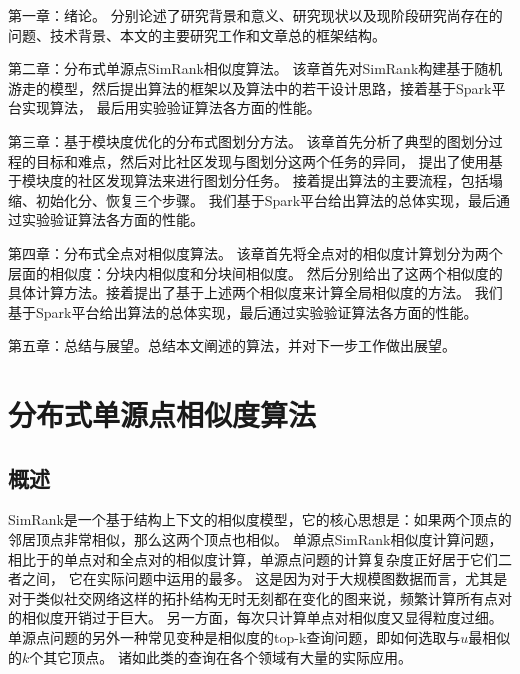 \documentclass[master]{njuthesis}
\begin{document}
第一章：绪论。 分别论述了研究背景和意义、研究现状以及现阶段研究尚存在的问题、技术背景、本文的主要研究工作和文章总的框架结构。

第二章：分布式单源点SimRank相似度算法。 
该章首先对SimRank构建基于随机游走的模型，然后提出算法的框架以及算法中的若干设计思路，接着基于Spark平台实现算法，
最后用实验验证算法各方面的性能。

第三章：基于模块度优化的分布式图划分方法。 该章首先分析了典型的图划分过程的目标和难点，然后对比社区发现与图划分这两个任务的异同，
提出了使用基于模块度的社区发现算法来进行图划分任务。 接着提出算法的主要流程，包括塌缩、初始化分、恢复三个步骤。
我们基于Spark平台给出算法的总体实现，最后通过实验验证算法各方面的性能。

第四章：分布式全点对相似度算法。 该章首先将全点对的相似度计算划分为两个层面的相似度：分块内相似度和分块间相似度。
然后分别给出了这两个相似度的具体计算方法。接着提出了基于上述两个相似度来计算全局相似度的方法。
我们基于Spark平台给出算法的总体实现，最后通过实验验证算法各方面的性能。

第五章：总结与展望。总结本文阐述的算法，并对下一步工作做出展望。


\chapter{分布式单源点相似度算法}\label{chapter_sssSimRank}

\section{概述}
SimRank是一个基于结构上下文的相似度模型，它的核心思想是：如果两个顶点的邻居顶点非常相似，那么这两个顶点也相似。
单源点SimRank相似度计算问题，相比于的单点对和全点对的相似度计算，单源点问题的计算复杂度正好居于它们二者之间，
它在实际问题中运用的最多。
这是因为对于大规模图数据而言，尤其是对于类似社交网络这样的拓扑结构无时无刻都在变化的图来说，频繁计算所有点对的相似度开销过于巨大。
另一方面，每次只计算单点对相似度又显得粒度过细。
单源点问题的另外一种常见变种是相似度的top\string-k查询问题，即如何选取与$u$最相似的$k$个其它顶点。
诸如此类的查询在各个领域有大量的实际应用。
\end{document}
